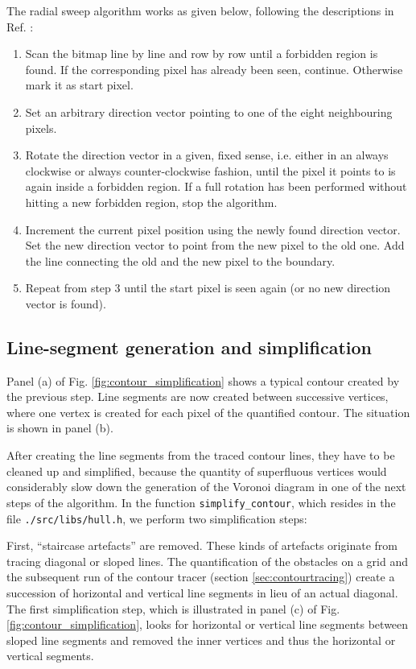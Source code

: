 The radial sweep algorithm works as given below, following the descriptions in Ref. \cite{web_radial_sweep}:
\begin{enumerate}
	\item Scan the bitmap line by line and row by row until a forbidden region is found. 
		If the corresponding pixel has already been seen, continue. Otherwise mark it as start pixel.
	\item Set an arbitrary direction vector pointing to one of the eight neighbouring pixels.
	\item Rotate the direction vector in a given, fixed sense, i.e. either in an always clockwise or 
		always counter-clockwise fashion, until the pixel it points to is again inside a forbidden region.
		If a full rotation has been performed without hitting a new forbidden region, stop the algorithm.
	\item Increment the current pixel position using the newly found direction vector. 
		Set the new direction vector to point from the new pixel to the old one.
		Add the line connecting the old and the new pixel to the boundary.
	\item Repeat from step 3 until the start pixel is seen again (or no new direction vector is found).
\end{enumerate}



\subsection{Line-segment generation and simplification}

Panel (a) of Fig. \ref{fig:contour_simplification} shows a typical contour created by the previous step.
Line segments are now created between successive vertices, where one vertex is created for each pixel of the
quantified contour. The situation is shown in panel (b).

After creating the line segments from the traced contour lines, they have to be cleaned up and simplified,
because the quantity of superfluous vertices would considerably slow down the generation of the Voronoi 
diagram in one of the next steps of the algorithm.
In the function \lstinline[language=C++]|simplify_contour|, which resides in the file \lstinline|./src/libs/hull.h|,
we perform two simplification steps:

First, ``staircase artefacts'' are removed. These kinds of artefacts originate from tracing diagonal or sloped lines.
The quantification of the obstacles on a grid and the subsequent run of the contour tracer (section \ref{sec:contourtracing})
create a succession of horizontal and vertical line segments in lieu of an actual diagonal.
The first simplification step, which is illustrated in panel (c) of Fig. \ref{fig:contour_simplification}, looks
for horizontal or vertical line segments between sloped line segments and removed the inner vertices and thus the
horizontal or vertical segments.

